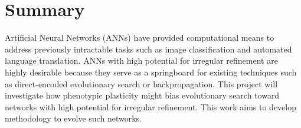 \section{Summary}
Artificial Neural Networks (ANNs) have provided computational means to address previously intractable tasks such as image classification and automated language translation.
ANNs with high potential for irregular refinement are highly desirable because they serve as a springboard for existing techniques such as direct-encoded evolutionary search or backpropagation.
This project will investigate how phenotypic plasticity might bias evolutionary search toward networks with high potential for irregular refinement.
This work aims to develop methodology to evolve such networks.
